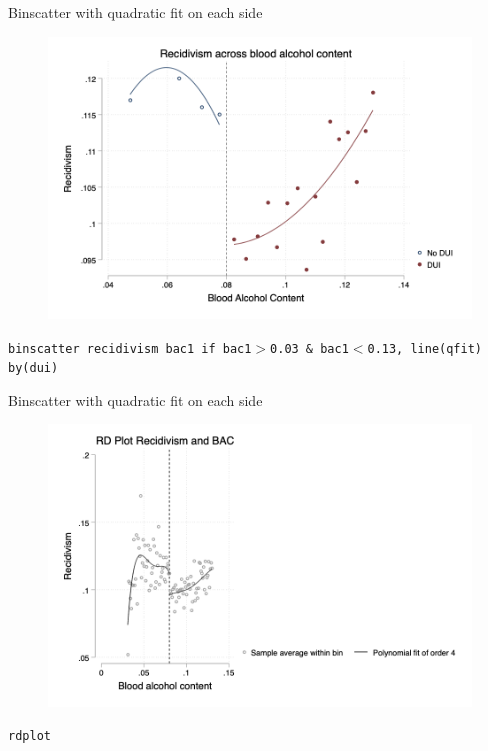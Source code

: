 \documentclass{beamer}
\begin{document}
\begin{frame}{Binscatter with quadratic fit on each side}

	\begin{figure}
	\includegraphics[scale=0.42]{./lecture_includes/hansen_binscatter_qfit}
	\end{figure}

\texttt{binscatter recidivism bac1 if bac1$>$0.03 \& bac1$<$0.13, line(qfit) by(dui)}
	
\end{frame}

\begin{frame}{Binscatter with quadratic fit on each side}

	\begin{figure}
	\includegraphics[scale=0.42]{./lecture_includes/hansen_rdplot}
	\end{figure}

\texttt{rdplot}
	
\end{frame}
\end{document}
